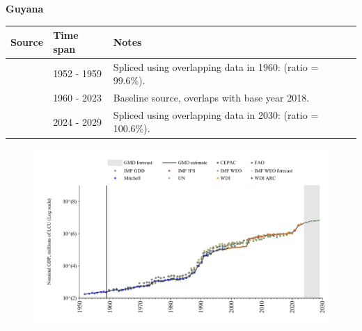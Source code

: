 \documentclass[12pt,a4paper,landscape]{article}
\begin{document}
\begin{adjustbox}{max totalsize={\paperwidth}{\paperheight},center}
\begin{minipage}[t][\textheight][t]{\textwidth}
\vspace*{0.5cm}
{}
\begin{center}
{\Large\bfseries Guyana}
\end{center}
\vspace{0.5cm}
\begin{table}[H]
\centering
\small
\begin{tabular}{|l|l|l|}
\hline
\textbf{Source} & \textbf{Time span} & \textbf{Notes} \\
\hline
\rowcolor{white}\cite{Mitchell}& 1952 - 1959 &Spliced using overlapping data in 1960: (ratio = 99.6\%).\\
\rowcolor{lightgray}\cite{WDI}& 1960 - 2023 &Baseline source, overlaps with base year 2018.\\
\rowcolor{white}\cite{IMF_WEO_forecast}& 2024 - 2029 &Spliced using overlapping data in 2030: (ratio = 100.6\%).\\
\hline
\end{tabular}
\end{table}
\begin{figure}[H]
\centering
\includegraphics[width=\textwidth,height=0.6\textheight,keepaspectratio]{graphs/GUY_nGDP.pdf}
\end{figure}
\end{minipage}
\end{adjustbox}
\end{document}
